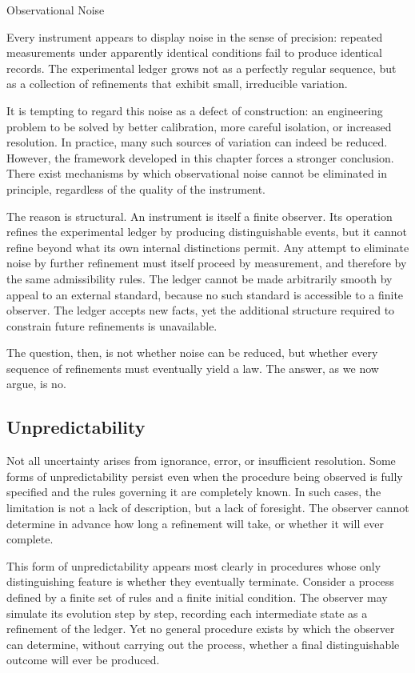 \begin{coda}{Observational Noise}

Every instrument appears to display noise in the sense of precision: repeated 
measurements under apparently identical conditions fail to produce identical records. The
experimental ledger grows not as a perfectly regular sequence, but as a
collection of refinements that exhibit small, irreducible variation.

It is tempting to regard this noise as a defect of construction: an
engineering problem to be solved by better calibration, more careful
isolation, or increased resolution. In practice, many such sources of
variation can indeed be reduced. However, the framework developed in this
chapter forces a stronger conclusion. There exist mechanisms by which
observational noise cannot be eliminated in principle, regardless of the
quality of the instrument.

The reason is structural. An instrument is itself a finite observer. Its
operation refines the experimental ledger by producing distinguishable
events, but it cannot refine beyond what its own internal distinctions
permit. Any attempt to eliminate noise by further refinement must itself
proceed by measurement, and therefore by the same admissibility rules. The
ledger cannot be made arbitrarily smooth by appeal to an external standard,
because no such standard is accessible to a finite observer.
The ledger
accepts new facts, yet the additional structure required to constrain future
refinements is unavailable.

The question, then, is not whether noise can be reduced, but whether every
sequence of refinements must eventually yield a law. The answer,
as we now argue, is no.

\subsection*{Unpredictability}

Not all uncertainty arises from ignorance, error, or insufficient
resolution. Some forms of unpredictability persist even when the procedure
being observed is fully specified and the rules governing it are completely
known. In such cases, the limitation is not a lack of description, but a lack
of foresight. The observer cannot determine in advance how long a refinement
will take, or whether it will ever complete.

This form of unpredictability appears most clearly in procedures whose only
distinguishing feature is whether they eventually terminate. Consider a
process defined by a finite set of rules and a finite initial condition. The
observer may simulate its evolution step by step, recording each intermediate
state as a refinement of the ledger. Yet no general procedure exists by which
the observer can determine, without carrying out the process, whether a final
distinguishable outcome will ever be produced.


\end{coda}
